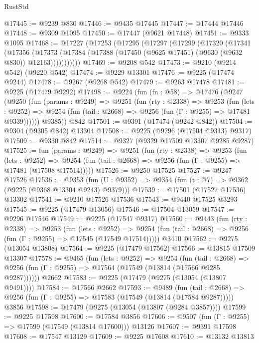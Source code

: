 \begin{lexlean}{RustStd}
\begin{coremodule}
@17445 := @9239 @830
@17446 := @9435 @17445
@17447 := @17444 @17446
@17448 := @9309 @1095
@17450 := @17447 (@9621 @17448)
@17451 := @9333 @1095
@17468 := @17227
    (@17253
      (@17295
        (@17297
          (@17299
            (@17320
              (@17341
                (@17356
                  (@17373
                    (@17384 (@17388 (@17450 (@9625 @17451) (@9630 (@9632 @830)) @12163)))))))))))
@17469 := @9208 @542
@17473 := @9210 (@9214 @542) (@9220 @542)
@17474 := @9229 @13301
@17476 := @9225 (@17474 @9244)
@17478 := @9267 (@9268 @542)
@17479 := @9263 @17478
@17481 := @9225 (@17479 @9292)
@17498 := @9224
    (fun (fn : @58) =>
    @17476
      (@9247
        (@9250
          (fun (params : @9249) =>
          @9251
            (fun (rty : @2338) =>
            @9253
              (fun (lets : @9252) =>
              @9254 (fun (tail : @2668) => @9256 (fun (Γ : @9255) => @17481 @9339))))))
        @9385))
    @842
@17501 := @9391 (@17474 (@9242 @842))
@17504 := @9304 (@9305 @842) @13304
@17508 := @9225 (@9296 (@17504 @9313) @9317)
@17509 := @9330 @842
@17514 := @9327 (@9329 @17509 @13307 @9285 @9287)
@17525 := fun (params : @9249) =>
  @9251
    (fun (rty : @2338) =>
    @9253
      (fun (lets : @9252) =>
      @9254 (fun (tail : @2668) => @9256 (fun (Γ : @9255) => @17481 (@17508 @17514)))))
@17526 := @9250 @17525
@17527 := @9247 @17526
@17536 := @9353
    (fun (U : @9352) => @9354 (fun (t : @7) => @9362 (@9225 (@9368 @13304 @9243) @9379)))
@17539 := @17501 (@17527 @17536) @13302
@17541 := @9210 @17526 @17536
@17543 := @9440 @17525 @3293
@17545 := @9225 (@17479 @13056)
@17546 := @17504 @13059
@17547 := @9296 @17546
@17549 := @9225 (@17547 @9317)
@17560 := @9443
    (fun (rty : @2338) =>
    @9253
      (fun (lets : @9252) =>
      @9254 (fun (tail : @2668) => @9256 (fun (Γ : @9255) => @17545 (@17549 @17514)))))
    @3410
@17562 := @9275 (@13054 @13808)
@17564 := @9225 (@17479 @17562)
@17566 := @13815 @17509 @13307
@17578 := @9465
    (fun (lets : @9252) =>
    @9254
      (fun (tail : @2668) =>
      @9256 (fun (Γ : @9255) => @17564 (@17549 (@13814 (@17566 @9285 @9287))))))
    @2662
@17583 := @9225 (@17479 (@9275 (@13054 (@13807 @9491))))
@17584 := @17566 @2662
@17593 := @9489
    (fun (tail : @2668) => @9256 (fun (Γ : @9255) => @17583 (@17549 (@13814 (@17584 @9287)))))
    @3856
@17598 := @17479 (@9275 (@13054 (@13807 (@9284 @3857))))
@17599 := @9225 @17598
@17600 := @17584 @3856
@17606 := @9507 (fun (Γ : @9255) => @17599 (@17549 (@13814 @17600))) @13126
@17607 := @9391 @17598
@17608 := @17547 @13129
@17609 := @9225 @17608
@17610 := @13132 @13813

\end{coremodule}
\end{lexlean}
